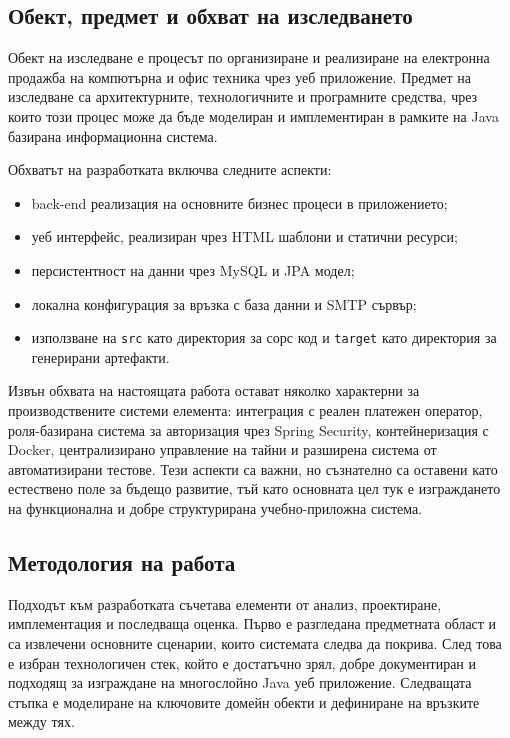 \subsection{Обект, предмет и обхват на изследването}

Обект на изследване е процесът по организиране и реализиране на електронна продажба на компютърна и офис техника чрез уеб приложение. Предмет на изследване са архитектурните, технологичните и програмните средства, чрез които този процес може да бъде моделиран и имплементиран в рамките на Java базирана информационна система.

Обхватът на разработката включва следните аспекти:

\begin{itemize}[leftmargin=*]
    \item back-end реализация на основните бизнес процеси в приложението;
    \item уеб интерфейс, реализиран чрез HTML шаблони и статични ресурси;
    \item персистентност на данни чрез MySQL и JPA модел;
    \item локална конфигурация за връзка с база данни и SMTP сървър;
    \item използване на \texttt{src} като директория за сорс код и \texttt{target} като директория за генерирани артефакти.
\end{itemize}

Извън обхвата на настоящата работа остават няколко характерни за производствените системи елемента: интеграция с реален платежен оператор, роля-базирана система за авторизация чрез Spring Security, контейнеризация с Docker, централизирано управление на тайни и разширена система от автоматизирани тестове. Тези аспекти са важни, но съзнателно са оставени като естествено поле за бъдещо развитие, тъй като основната цел тук е изграждането на функционална и добре структурирана учебно-приложна система.

\subsection{Методология на работа}

Подходът към разработката съчетава елементи от анализ, проектиране, имплементация и последваща оценка. Първо е разгледана предметната област и са извлечени основните сценарии, които системата следва да покрива. След това е избран технологичен стек, който е достатъчно зрял, добре документиран и подходящ за изграждане на многослойно Java уеб приложение. Следващата стъпка е моделиране на ключовите домейн обекти и дефиниране на връзките между тях.


